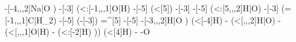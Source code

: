 \begin{struct}
{                                                                                    -[-4,,,2]Na|\textcolor{O}{O}
                                                                                  )
                                                                                -[-3]
                                                                                  (<:[-1,,,1]\textcolor{O}{O}|\textcolor{O}{H})
                                                                                -[-5]
                                                                                  (<[5])
                                                                                -[-3]
                                                                                -[-5]
                                                                                  (<:[5,,,2]\textcolor{O}{H}|\textcolor{O}{O})
                                                                                -[-3]
                                                                                  (=[-1,,,1]C|H_2)
                                                                                -[-5]
                                                                                  (-[-3])
                                                                                =^[5]
                                                                                -[-5]
                                                                                -[-3,,,2]\textcolor{O}{H}|\textcolor{O}{O}
                                                                              )
                                                                                (<[-4]H)
                                                                              -
                                                                                (<[,,,2]\textcolor{O}{H}|\textcolor{O}{O})
                                                                              -
                                                                                (<[,,,1]\textcolor{O}{O}|\textcolor{O}{H})
                                                                              -
                                                                                (<:[-2]H)
                                                                            ))
                                                                              (<[4]H)
                                                                            -
                                                                            -\textcolor{O}{O}
}
\end{struct}
